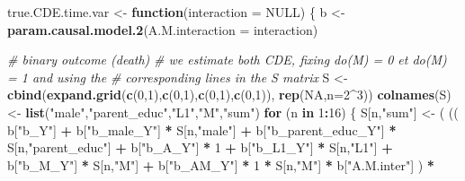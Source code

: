 \documentclass[
]{book}
\newenvironment{Shaded}{\begin{snugshade}}{\end{snugshade}}
\newcommand{\AttributeTok}[1]{\textcolor[rgb]{0.13,0.29,0.53}{#1}}
\newcommand{\CommentTok}[1]{\textcolor[rgb]{0.56,0.35,0.01}{\textit{#1}}}
\newcommand{\ConstantTok}[1]{\textcolor[rgb]{0.56,0.35,0.01}{#1}}
\newcommand{\ControlFlowTok}[1]{\textcolor[rgb]{0.13,0.29,0.53}{\textbf{#1}}}
\newcommand{\DecValTok}[1]{\textcolor[rgb]{0.00,0.00,0.81}{#1}}
\newcommand{\FunctionTok}[1]{\textcolor[rgb]{0.13,0.29,0.53}{\textbf{#1}}}
\newcommand{\NormalTok}[1]{#1}
\newcommand{\OtherTok}[1]{\textcolor[rgb]{0.56,0.35,0.01}{#1}}
\newcommand{\SpecialCharTok}[1]{\textcolor[rgb]{0.81,0.36,0.00}{\textbf{#1}}}
\newcommand{\StringTok}[1]{\textcolor[rgb]{0.31,0.60,0.02}{#1}}
\begin{document}
\begin{Shaded}
\begin{Highlighting}[]
\NormalTok{true.CDE.time.var }\OtherTok{\textless{}{-}} \ControlFlowTok{function}\NormalTok{(}\AttributeTok{interaction =} \ConstantTok{NULL}\NormalTok{) \{}
\NormalTok{  b }\OtherTok{\textless{}{-}} \FunctionTok{param.causal.model.2}\NormalTok{(}\AttributeTok{A.M.interaction =}\NormalTok{ interaction)}
  
  \CommentTok{\# binary outcome (death)}
  \CommentTok{\# we estimate both CDE, fixing do(M) = 0 et do(M) = 1 and using the }
  \CommentTok{\# corresponding lines in the S matrix}
\NormalTok{  S }\OtherTok{\textless{}{-}} \FunctionTok{cbind}\NormalTok{(}\FunctionTok{expand.grid}\NormalTok{(}\FunctionTok{c}\NormalTok{(}\DecValTok{0}\NormalTok{,}\DecValTok{1}\NormalTok{),}\FunctionTok{c}\NormalTok{(}\DecValTok{0}\NormalTok{,}\DecValTok{1}\NormalTok{),}\FunctionTok{c}\NormalTok{(}\DecValTok{0}\NormalTok{,}\DecValTok{1}\NormalTok{),}\FunctionTok{c}\NormalTok{(}\DecValTok{0}\NormalTok{,}\DecValTok{1}\NormalTok{)), }\FunctionTok{rep}\NormalTok{(}\ConstantTok{NA}\NormalTok{,}\AttributeTok{n=}\DecValTok{2}\SpecialCharTok{\^{}}\DecValTok{3}\NormalTok{))}
  \FunctionTok{colnames}\NormalTok{(S) }\OtherTok{\textless{}{-}} \FunctionTok{list}\NormalTok{(}\StringTok{"male"}\NormalTok{,}\StringTok{"parent\_educ"}\NormalTok{,}\StringTok{"L1"}\NormalTok{,}\StringTok{"M"}\NormalTok{,}\StringTok{"sum"}\NormalTok{)}
  \ControlFlowTok{for}\NormalTok{ (n }\ControlFlowTok{in} \DecValTok{1}\SpecialCharTok{:}\DecValTok{16}\NormalTok{) \{}
\NormalTok{    S[n,}\StringTok{"sum"}\NormalTok{] }\OtherTok{\textless{}{-}}\NormalTok{ ( (( b[}\StringTok{"b\_Y"}\NormalTok{] }\SpecialCharTok{+} 
\NormalTok{                        b[}\StringTok{"b\_male\_Y"}\NormalTok{] }\SpecialCharTok{*}\NormalTok{ S[n,}\StringTok{"male"}\NormalTok{] }\SpecialCharTok{+} 
\NormalTok{                        b[}\StringTok{"b\_parent\_educ\_Y"}\NormalTok{] }\SpecialCharTok{*}\NormalTok{ S[n,}\StringTok{"parent\_educ"}\NormalTok{] }\SpecialCharTok{+} 
\NormalTok{                        b[}\StringTok{"b\_A\_Y"}\NormalTok{] }\SpecialCharTok{*} \DecValTok{1} \SpecialCharTok{+} 
\NormalTok{                        b[}\StringTok{"b\_L1\_Y"}\NormalTok{] }\SpecialCharTok{*}\NormalTok{ S[n,}\StringTok{"L1"}\NormalTok{] }\SpecialCharTok{+}
\NormalTok{                        b[}\StringTok{"b\_M\_Y"}\NormalTok{] }\SpecialCharTok{*}\NormalTok{ S[n,}\StringTok{"M"}\NormalTok{] }\SpecialCharTok{+}
\NormalTok{                        b[}\StringTok{"b\_AM\_Y"}\NormalTok{] }\SpecialCharTok{*} \DecValTok{1} \SpecialCharTok{*}\NormalTok{ S[n,}\StringTok{"M"}\NormalTok{] }\SpecialCharTok{*}\NormalTok{ b[}\StringTok{"A.M.inter"}\NormalTok{] ) }\SpecialCharTok{*}

\end{Highlighting}
\end{Shaded}
\end{document}
